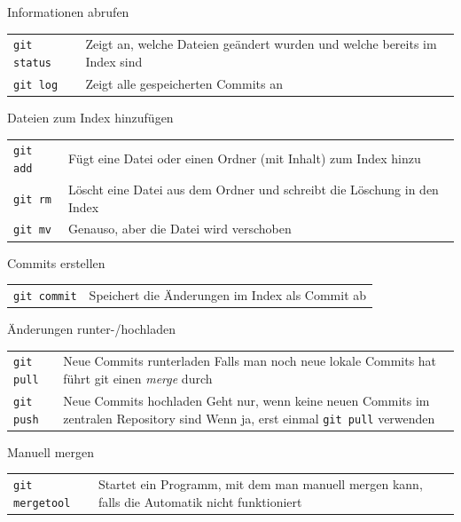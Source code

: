 \begin{frame}{Informationen abrufen}
  \begin{tabular}{lp{20em}}
    \texttt{git status} & Zeigt an, welche Dateien geändert wurden und welche bereits im Index sind \\
    \texttt{git log}    & Zeigt alle gespeicherten Commits an
  \end{tabular}
\end{frame}

\begin{frame}{Dateien zum Index hinzufügen}
  \begin{tabular}{lp{20em}}
    \texttt{git add} & Fügt eine Datei oder einen Ordner (mit Inhalt) zum Index hinzu \\
    \texttt{git rm}  & Löscht eine Datei aus dem Ordner und schreibt die Löschung in den Index  \\
    \texttt{git mv}  & Genauso, aber die Datei wird verschoben
  \end{tabular}
\end{frame}

\begin{frame}{Commits erstellen}
  \begin{tabular}{lp{20em}}
    \texttt{git commit} & Speichert die Änderungen im Index als Commit ab
  \end{tabular}
\end{frame}

\begin{frame}{Änderungen runter-/hochladen}
  \begin{tabular}{lp{20em}}
    \texttt{git pull} & Neue Commits runterladen \newline
                      Falls man noch neue lokale Commits hat führt git einen \textit{merge} durch \\
    \texttt{git push} & Neue Commits hochladen \newline
                      Geht nur, wenn keine neuen Commits im zentralen Repository sind \newline
                      Wenn ja, erst einmal \texttt{git pull} verwenden
  \end{tabular}
\end{frame}

\begin{frame}{Manuell mergen}
  \begin{tabular}{lp{20em}}
    \texttt{git mergetool} & Startet ein Programm, mit dem man manuell mergen kann, falls die Automatik nicht funktioniert
  \end{tabular}
\end{frame}
